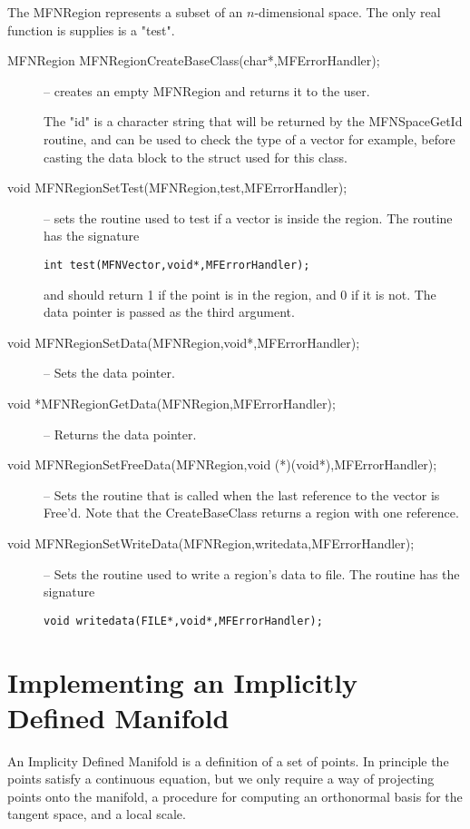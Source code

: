 \documentclass[12pt]{article}
\begin{document}
The MFNRegion represents a subset of an $n$-dimensional space. The only real function is
supplies is a "test".
\begin{description}
\item [MFNRegion MFNRegionCreateBaseClass(char*,MFErrorHandler);]
-- creates an empty MFNRegion and returns it to the user.

 The "id" is a character string
 that will be returned by the {MFNSpaceGetId} routine, and can be used to check the type
 of a vector for example, before casting the data block to the struct used for this class.
\item [void MFNRegionSetTest(MFNRegion,test,MFErrorHandler);]
-- sets the routine used to test if a vector is inside the region.
The routine has the signature
\begin{verbatim}
int test(MFNVector,void*,MFErrorHandler);
\end{verbatim}
and should return 1 if the point is in the region, and 0 if it is not. The data pointer is
passed as the third argument.
\item [void MFNRegionSetData(MFNRegion,void*,MFErrorHandler);]
-- Sets the data pointer.
\item [void *MFNRegionGetData(MFNRegion,MFErrorHandler);]
-- Returns the data pointer.
\item [void MFNRegionSetFreeData(MFNRegion,void (*)(void*),MFErrorHandler);]
 -- Sets the routine that is called when the last reference to the vector is Free'd.
 Note that the {CreateBaseClass} returns a region with one reference.
\item [void MFNRegionSetWriteData(MFNRegion,writedata,MFErrorHandler);]
 -- Sets the routine used to write a region's data to file. The routine has the signature
\begin{verbatim}
void writedata(FILE*,void*,MFErrorHandler);
\end{verbatim}
\end{description}

\section{Implementing an Implicitly Defined Manifold}

    An Implicity Defined Manifold is a definition of a set of
    points. In principle the points satisfy a continuous equation,
    but we only require a way of projecting points onto the manifold,
    a procedure for computing an orthonormal basis for the tangent
    space, and a local scale.
\end{document}
